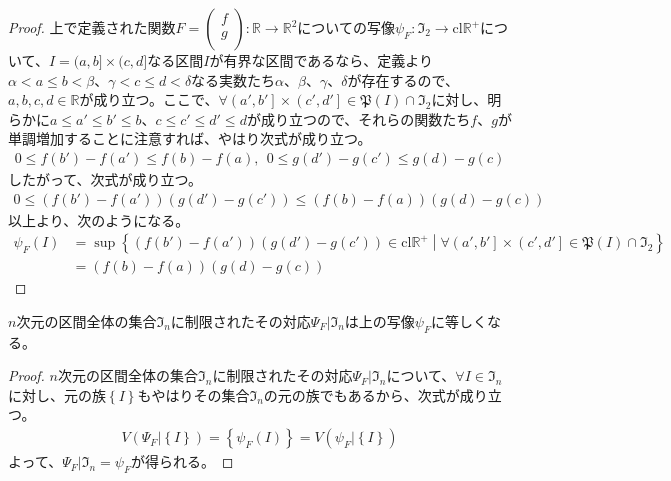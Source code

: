 \documentclass[dvipdfmx]{jsarticle}
\begin{document}
\begin{proof} 上で定義された関数$F = \begin{pmatrix}
f \\
g \\
\end{pmatrix}:\mathbb{R} \rightarrow \mathbb{R}^{2}$についての写像$\psi_{F}:\mathfrak{I}_{2} \rightarrow \mathrm{cl}\mathbb{R}^{+}$について、$I = (a,b] \times (c,d]$なる区間$I$が有界な区間であるなら、定義より$\alpha < a \leq b < \beta$、$\gamma < c \leq d < \delta$なる実数たち$\alpha$、$\beta$、$\gamma$、$\delta$が存在するので、$a,b,c,d \in \mathbb{R}$が成り立つ。ここで、$\forall\left( a',b' \right] \times \left( c',d' \right]\in \mathfrak{P}(I) \cap \mathfrak{I}_{2}$に対し、明らかに$a \leq a' \leq b' \leq b$、$c \leq c' \leq d' \leq d$が成り立つので、それらの関数たち$f$、$g$が単調増加することに注意すれば、やはり次式が成り立つ。
\begin{align*}
0 \leq f\left( b' \right) - f\left( a' \right) \leq f(b) - f(a),\ \ 0 \leq g\left( d' \right) - g\left( c' \right) \leq g(d) - g(c)
\end{align*}
したがって、次式が成り立つ。
\begin{align*}
0 \leq \left( f\left( b' \right) - f\left( a' \right) \right)\left( g\left( d' \right) - g\left( c' \right) \right) \leq \left( f(b) - f(a) \right)\left( g(d) - g(c) \right)
\end{align*}
以上より、次のようになる。
\begin{align*}
\psi_{F}(I) &= \sup\left\{ \left( f\left( b' \right) - f\left( a' \right) \right)\left( g\left( d' \right) - g\left( c' \right) \right) \in \mathrm{cl}\mathbb{R}^{+} \middle| \forall\left( a',b' \right] \times \left( c',d' \right]\in \mathfrak{P}(I) \cap \mathfrak{I}_{2} \right\}\\
&= \left( f(b) - f(a) \right)\left( g(d) - g(c) \right)
\end{align*}
\end{proof}
\begin{thm}\label{4.5.4.2}
$n$次元の区間全体の集合$\mathfrak{I}_{n}$に制限されたその対応$\varPsi_{F}|\mathfrak{I}_{n}$は上の写像$\psi_{F}$に等しくなる。
\end{thm}
\begin{proof}
$n$次元の区間全体の集合$\mathfrak{I}_{n}$に制限されたその対応$\varPsi_{F}|\mathfrak{I}_{n}$について、$\forall I \in \mathfrak{I}_{n}$に対し、元の族$\left\{ I \right\}$もやはりその集合$\mathfrak{I}_{n}$の元の族でもあるから、次式が成り立つ。
\begin{align*}
V\left( \varPsi_{F}|\left\{ I \right\} \right) = \left\{ \psi_{F}(I) \right\} = V\left( \psi_{F}|\left\{ I \right\} \right)
\end{align*}
よって、$\varPsi_{F}|\mathfrak{I}_{n} = \psi_{F}$が得られる。
\end{proof}
\end{document}
